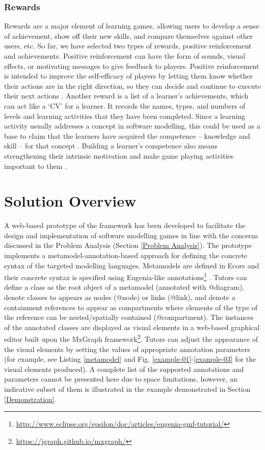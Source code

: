 \documentclass[conference]{IEEEtran}
\begin{document}
\subsubsection{Rewards}
\label{Rewards}
Rewards are a major element of learning games, allowing users to develop a sense of achievement, show off their new skills, and compare themselves against other users, etc. So far, we have selected two types of rewards, positive reinforcement and achievements. Positive reinforcement can have the form of sounds, visual effects, or motivating messages to give feedback to players. Positive reinforcement is intended to improve the self-efficacy of players by letting them know whether their actions are in the right direction, so they can decide and continue to execute their next actions \cite{richter2015studying}. Another reward is a list of a learner's achievements, which can act like a `CV' for a learner. It records the names, types, and numbers of levels and learning activities that they have been completed. Since a learning activity usually addresses a concept in software modelling, this could be used as a base to claim that the learners have acquired the competence -- knowledge and skill -- for that concept \cite{richter2015studying}. Building a learner's competence also means strengthening their intrinsic motivation \cite{ryan2017self} and make game playing  activities important to them \cite{nicholson2015recipe}.

\section{Solution Overview}
\label{Solution Overview}
A web-based prototype of the framework has been developed to facilitate the design and implementation of software modelling games in line with the concerns discussed in the Problem Analysis (Section \ref{Problem Analysis}). The prototype implements a metamodel-annotation-based approach for defining the concrete syntax of the targeted modelling languages. Metamodels are defined in Ecore \cite{steinberg2008emf} and their concrete syntax is specified using Eugenia-like annotations\footnote{\url{http://www.eclipse.org/epsilon/doc/articles/eugenia-gmf-tutorial/}} \cite{kolovos2015eugenia}. Tutors can define a class as the root object of a metamodel (annotated with {\selectfont @diagram}), denote classes to appears as nodes ({\selectfont @node}) or links ({\selectfont @link}), and denote a containment references to appear as compartments where elements of the type of the reference can be nested/spatially contained ({\selectfont @compartment}). The instances of the annotated classes are displayed as visual elements in a web-based graphical editor built upon the MxGraph framework\footnote{\url{https://jgraph.github.io/mxgraph/}}. Tutors can adjust the appearance of the visual elements by setting the values of appropriate annotation parameters (for example, see Listing \ref{metamodel} and Fig. \ref{example-01}-\ref{example-03} for the visual elements produced). A complete list of the supported annotations and parameters cannot be presented here due to space limitations, however, an indicative subset of them is illustrated in the example demonstrated in Section \ref{Demonstration}.
\end{document}
